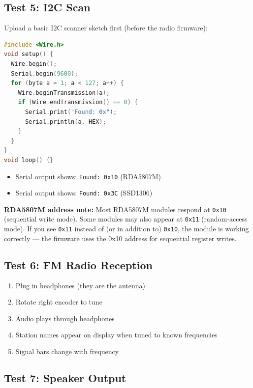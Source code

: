 \documentclass[a4paper,11pt]{article}
\renewcommand*{\,}{ }%
\begin{document}
\subsection{Test 5: I2C Scan}

Upload a basic I2C scanner sketch first (before the radio firmware):

\begin{lstlisting}[language=C++,numbers=none]
#include <Wire.h>
void setup() {
  Wire.begin();
  Serial.begin(9600);
  for (byte a = 1; a < 127; a++) {
    Wire.beginTransmission(a);
    if (Wire.endTransmission() == 0) {
      Serial.print("Found: 0x");
      Serial.println(a, HEX);
    }
  }
}
void loop() {}
\end{lstlisting}

\begin{itemize}
    \item[$\square$] Serial output shows: \texttt{Found: 0x10} (RDA5807M)
    \item[$\square$] Serial output shows: \texttt{Found: 0x3C} (SSD1306)
\end{itemize}

\begin{infobox}
\textbf{RDA5807M address note:} Most RDA5807M modules respond at \texttt{0x10} (sequential write mode). Some modules may also appear at \texttt{0x11} (random-access mode). If you see \texttt{0x11} instead of (or in addition to) \texttt{0x10}, the module is working correctly --- the firmware uses the 0x10 address for sequential register writes.
\end{infobox}

\subsection{Test 6: FM Radio Reception}

\begin{enumerate}
    \item Plug in headphones (they are the antenna)
    \item Rotate right encoder to tune
    \item[$\square$] Audio plays through headphones
    \item[$\square$] Station names appear on display when tuned to known frequencies
    \item[$\square$] Signal bars change with frequency
\end{enumerate}

\subsection{Test 7: Speaker Output}
\end{document}
